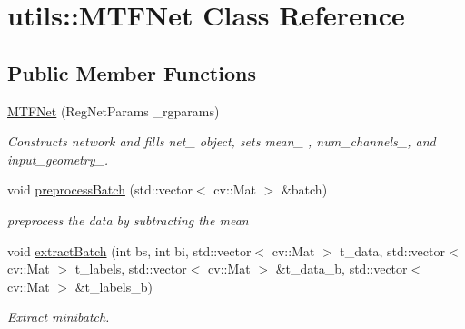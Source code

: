 \hypertarget{classutils_1_1MTFNet}{\section{utils\-:\-:M\-T\-F\-Net Class Reference}
\label{classutils_1_1MTFNet}
}
\subsection*{Public Member Functions}
\begin{DoxyCompactItemize}
\item 
\hypertarget{classutils_1_1MTFNet_a2fae5241e9c54156b6e6a880671e0e08}{\hyperlink{classutils_1_1MTFNet_a2fae5241e9c54156b6e6a880671e0e08}{M\-T\-F\-Net} (Reg\-Net\-Params \-\_\-rgparams)}\label{classutils_1_1MTFNet_a2fae5241e9c54156b6e6a880671e0e08}

\begin{DoxyCompactList}\small\item\em Constructs network and fills net\-\_\- object, sets mean\-\_\- , num\-\_\-channels\-\_\-, and input\-\_\-geometry\-\_\-. \end{DoxyCompactList}\item 
\hypertarget{classutils_1_1MTFNet_a77607498ecd7d980a2045c7e9b121246}{void \hyperlink{classutils_1_1MTFNet_a77607498ecd7d980a2045c7e9b121246}{preprocess\-Batch} (std\-::vector$<$ cv\-::\-Mat $>$ \&batch)}\label{classutils_1_1MTFNet_a77607498ecd7d980a2045c7e9b121246}

\begin{DoxyCompactList}\small\item\em preprocess the data by subtracting the mean \end{DoxyCompactList}\item 
\hypertarget{classutils_1_1MTFNet_a2877464498807a99ac22150c03d017c3}{void \hyperlink{classutils_1_1MTFNet_a2877464498807a99ac22150c03d017c3}{extract\-Batch} (int bs, int bi, std\-::vector$<$ cv\-::\-Mat $>$ t\-\_\-data, std\-::vector$<$ cv\-::\-Mat $>$ t\-\_\-labels, std\-::vector$<$ cv\-::\-Mat $>$ \&t\-\_\-data\-\_\-b, std\-::vector$<$ cv\-::\-Mat $>$ \&t\-\_\-labels\-\_\-b)}\label{classutils_1_1MTFNet_a2877464498807a99ac22150c03d017c3}

\begin{DoxyCompactList}\small\item\em Extract minibatch. \end{DoxyCompactList}\end{DoxyCompactItemize}
